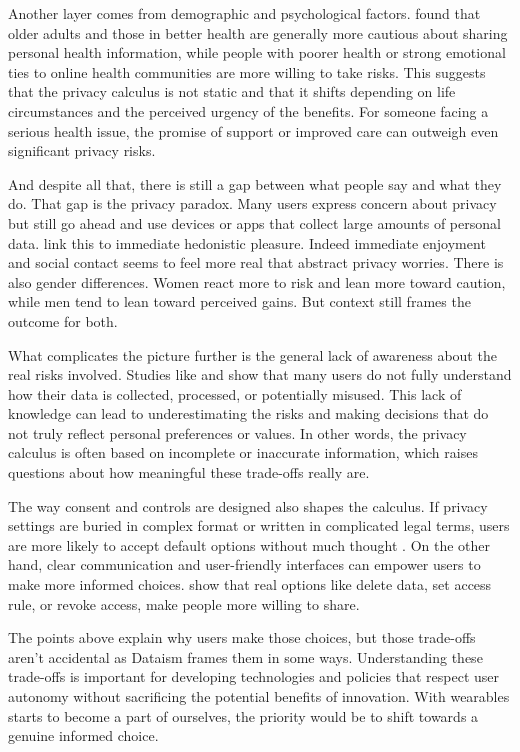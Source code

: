 	Another layer comes from demographic and psychological factors. \cite{Kordzadeh2016} found that older adults and those in better health are generally more cautious about sharing personal health information, while people with poorer health or strong emotional ties to online health communities are more willing to take risks. This suggests that the privacy calculus is not static and that it shifts depending on life circumstances and the perceived urgency of the benefits. For someone facing a serious health issue, the promise of support or improved care can outweigh even significant privacy risks.

	And despite all that, there is still a gap between what people say and what they do. That gap is the privacy paradox. Many users express concern about privacy but still go ahead and use devices or apps that collect large amounts of personal data. \cite{Sun2015} link this to immediate hedonistic pleasure. Indeed immediate enjoyment and social contact seems to feel more real that abstract privacy worries. There is also gender differences. Women react more to risk and lean more toward caution, while men tend to lean toward perceived gains. But context still frames the outcome for both.

	What complicates the picture further is the general lack of awareness about the real risks involved. Studies like \cite{Cilliers2019} and \cite{Datta2018} show that many users do not fully understand how their data is collected, processed, or potentially misused. This lack of knowledge can lead to underestimating the risks and making decisions that do not truly reflect personal preferences or values. In other words, the privacy calculus is often based on incomplete or inaccurate information, which raises questions about how meaningful these trade-offs really are.

	The way consent and controls are designed also shapes the calculus. If privacy settings are buried in complex format or written in complicated legal terms, users are more likely to accept default options without much thought \cite{Banerjee2018}. On the other hand, clear communication and user-friendly interfaces can empower users to make more informed choices. \cite{Gupta2023} show that real options like delete data, set access rule, or revoke access, make people more willing to share.

	The points above explain why users make those choices, but those trade-offs aren't accidental as Dataism frames them in some ways. Understanding these trade-offs is important for developing technologies and policies that respect user autonomy without sacrificing the potential benefits of innovation. With wearables starts to become a part of ourselves, the priority would be to shift towards a genuine informed choice.
